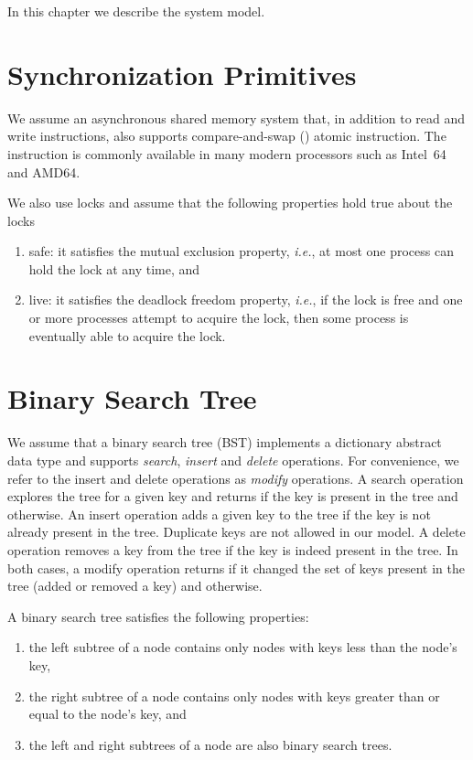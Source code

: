 In this chapter we describe the system model.

\section{Synchronization Primitives}
We assume an asynchronous shared memory system that, in addition to read and write instructions, also supports compare-and-swap (\CAS{}) atomic instruction. The \CAS{} instruction is commonly available in many modern processors such as Intel~64 and AMD64. 

We also use locks and assume that the following properties hold true about the locks
\begin{enumerate}[label=(\alph*)]
\item safe: it satisfies the mutual exclusion property, \emph{i.e.}, at most one process can hold the lock at any time, and 
\item live: it satisfies the deadlock freedom property, \emph{i.e.}, if the lock is free and one or more processes attempt to acquire the lock, then some process is eventually able to acquire the lock.
\end{enumerate}

\section{Binary Search Tree}
We assume that a binary search tree (BST) implements a dictionary abstract data type and supports \emph{search}, \emph{insert} and \emph{delete} operations. For convenience, we refer to the insert and delete operations as \emph{modify} operations. A search operation explores the tree for a given key and returns \true{} if the key is present in the tree and \false{} otherwise. An insert operation adds a given key to the tree if the key is not already present in the tree. Duplicate keys are not allowed in our model. A delete operation removes a key from the tree if the key is indeed present in the tree. In both cases, a modify operation returns \true{} if it changed the set of keys present in the tree (added or removed a key) and \false{} otherwise.

A binary search tree satisfies the following properties:
\begin{enumerate}[label=(\alph*)]
\item the left subtree of a node contains only nodes with keys less than the node's key, 
\item the right subtree of a node contains only nodes with keys greater than or equal to the node's key, and
\item the left and right subtrees of a node are also binary search trees.
\end{enumerate}

